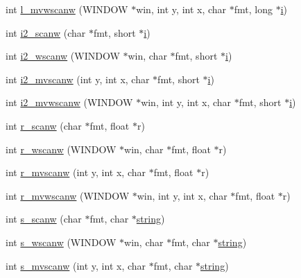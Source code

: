 \begin{DoxyCompactItemize}
int \hyperlink{C-macros_8c_afd4ce2c83673e3073a46a6c0e05b235b}{l\+\_\+mvwscanw} (W\+I\+N\+D\+OW $\ast$win, int y, int x, char $\ast$fmt, long $\ast$\hyperlink{intro__blas1_83_8txt_a8ba82a50c0c2c12d5f6a77f7e4651c0b}{i})
\item 
int \hyperlink{C-macros_8c_ad51e0ab478b4039b3191e38e31ee0676}{i2\+\_\+scanw} (char $\ast$fmt, short $\ast$\hyperlink{intro__blas1_83_8txt_a8ba82a50c0c2c12d5f6a77f7e4651c0b}{i})
\item 
int \hyperlink{C-macros_8c_a44593e3cd853674d1c25ad8295a5e7d2}{i2\+\_\+wscanw} (W\+I\+N\+D\+OW $\ast$win, char $\ast$fmt, short $\ast$\hyperlink{intro__blas1_83_8txt_a8ba82a50c0c2c12d5f6a77f7e4651c0b}{i})
\item 
int \hyperlink{C-macros_8c_ac3ddc9a07837b44a0d66ef085f764609}{i2\+\_\+mvscanw} (int y, int x, char $\ast$fmt, short $\ast$\hyperlink{intro__blas1_83_8txt_a8ba82a50c0c2c12d5f6a77f7e4651c0b}{i})
\item 
int \hyperlink{C-macros_8c_aa6f3d74bf85893265213c40cb5b732e6}{i2\+\_\+mvwscanw} (W\+I\+N\+D\+OW $\ast$win, int y, int x, char $\ast$fmt, short $\ast$\hyperlink{intro__blas1_83_8txt_a8ba82a50c0c2c12d5f6a77f7e4651c0b}{i})
\item 
int \hyperlink{C-macros_8c_ae894ccf3428f2f98a5a10a654b34180a}{r\+\_\+scanw} (char $\ast$fmt, float $\ast$r)
\item 
int \hyperlink{C-macros_8c_a8e85ec34aaf96f801923ac941e9435c4}{r\+\_\+wscanw} (W\+I\+N\+D\+OW $\ast$win, char $\ast$fmt, float $\ast$r)
\item 
int \hyperlink{C-macros_8c_a63197ac5eb05fa04cb88458e24ba8b98}{r\+\_\+mvscanw} (int y, int x, char $\ast$fmt, float $\ast$r)
\item 
int \hyperlink{C-macros_8c_a7db28527589679384ae2e79c665eddb4}{r\+\_\+mvwscanw} (W\+I\+N\+D\+OW $\ast$win, int y, int x, char $\ast$fmt, float $\ast$r)
\item 
int \hyperlink{C-macros_8c_a1e1dafd3d6cad8ea2d5f8609c242066e}{s\+\_\+scanw} (char $\ast$fmt, char $\ast$\hyperlink{what__overview_81_8txt_a74cb7e955273b9f9157b4f0c18a38849}{string})
\item 
int \hyperlink{C-macros_8c_a261b2a08296fc9699afe31cc2c578410}{s\+\_\+wscanw} (W\+I\+N\+D\+OW $\ast$win, char $\ast$fmt, char $\ast$\hyperlink{what__overview_81_8txt_a74cb7e955273b9f9157b4f0c18a38849}{string})
\item 
int \hyperlink{C-macros_8c_aadefc5909b2feb200bb34f11b0dd18d1}{s\+\_\+mvscanw} (int y, int x, char $\ast$fmt, char $\ast$\hyperlink{what__overview_81_8txt_a74cb7e955273b9f9157b4f0c18a38849}{string})

\end{DoxyCompactItemize}
